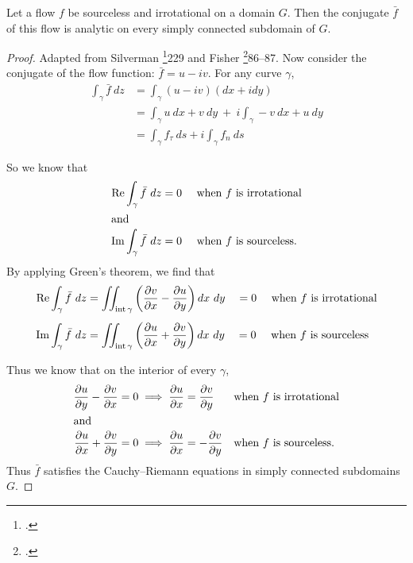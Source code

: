 \documentclass[letterpaper, twoside, 12 pt]{article}
\begin{document}
	\begin{theorem}
		Let a flow $f$ be sourceless and irrotational on a domain $G$.
		Then the conjugate $\bar f$ of this flow is analytic on every simply connected subdomain of $G$.
	\end{theorem}
	\begin{proof}
		Adapted from Silverman \footcite{silverman}{229} and Fisher \footcite{fisher}{86--87}.
		Now consider the conjugate of the flow function: $\bar f = u - i v$.
		For any curve $\gamma$,
		\begin{align*}
			\int_\gamma \bar f \ dz &= \int_\gamma (u - iv) (dx + i dy) \\
			&= \int_\gamma u\> dx + v\> dy \ + \ i \! \int_\gamma -v \> dx + u \> dy\\
			&= \int_\gamma f_\tau \ ds + i \int_\gamma f_n \ ds
		\end{align*}

		So we know that 
		\begin{align*}
			\operatorname*{Re} \int_\gamma \bar f \ dz &= 0 \quad \text{ when $f$ is irrotational}\\
			\intertext{and}
			\operatorname*{Im} \int_\gamma \bar f \ dz &= 0 \quad \text{ when $f$ is sourceless.}
		\end{align*}
		By applying Green's theorem, we find that 
		\begin{align*}
			\operatorname*{Re} \int_\gamma \bar f \ dz &= \iint_{\operatorname*{int} \gamma} \left( \frac{\partial v}{\partial x} - \frac{\partial u}{\partial y} \right) dx\ dy 
			\quad = 0 \quad \text{ when $f$ is irrotational}\\[1 ex]
			\operatorname*{Im} \int_\gamma \bar f \ dz &= \iint_{\operatorname*{int} \gamma} \left( \frac{\partial u}{\partial x} + \frac{\partial v}{\partial y} \right) dx\ dy 
			\quad = 0 \quad \text{ when $f$ is sourceless}
		\end{align*}

		Thus we know that on the interior of every $\gamma$, 
		\begin{align*}
			\frac{\partial u}{\partial y} - \frac{\partial v}{\partial x} &= 0 \implies \frac{\partial u}{\partial x} = \frac{\partial v}{\partial y} & &\text{when $f$ is irrotational} \\
			\intertext{and}
			\frac{\partial u}{\partial x} + \frac{\partial v}{\partial y} &= 0 \implies \frac{\partial u}{\partial x} = - \frac{\partial v}{\partial y} & &\text{when $f$ is sourceless.} \\
		\end{align*}
		Thus $\bar f$ satisfies the Cauchy--Riemann equations in simply connected subdomains $G$.
	\end{proof}
\end{document}
